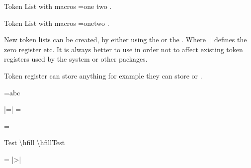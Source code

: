 \begin{texexample}{Token List with macros}{}
\begingroup
\def\c{one}
\def\d{two}
\newtoks\blist 
\blist={{\c} {\d}}
\the\blist. 
\endgroup
\end{texexample}


\begin{texexample}{Token List with macros}{}
\begingroup
\def\c{one}
\def\d{two}
\newtoks\blist 
\blist={\c \d}
\the\blist. 
\endgroup
\end{texexample}

New token lists can be created, by either using the \cmd{\newtoks} or the \cmd{\toks}. Where || defines the zero register etc. It is always better to use \cmd{\newtoks} in order not to affect existing token registers used by the system or other packages.

Token register can store anything for example they can store \cmd{\vfil} or \cmd{\hfill}.

\begin{codeexample}[vbox]
={abc}   \the{}\par
|=|     =  \the{}\par

\newtoks\ToksOne 
\ToksOne={Test \textbackslash hfill \textbackslash hfill\hfil\hfill Test\par}      
\newtoks\ToksTwo \ToksTwo=\ToksOne \the\ToksTwo
\noindent |>|\texttt{\the\ToksOne } 
\end{codeexample}

